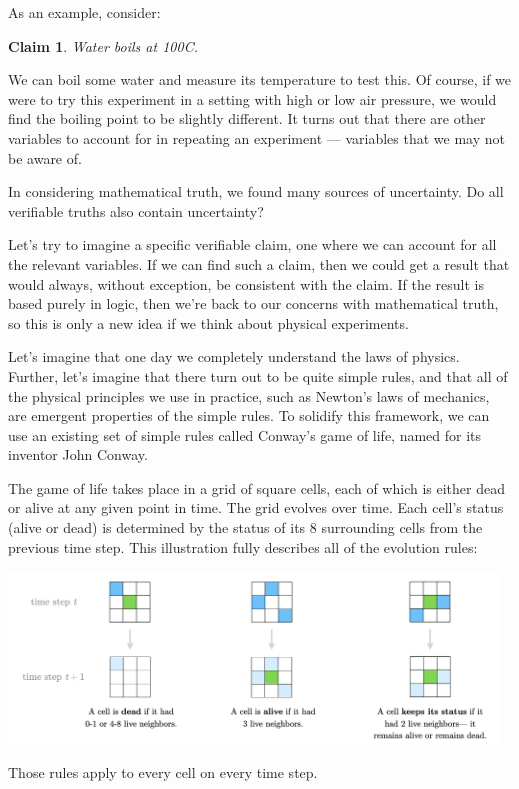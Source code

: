 \documentclass[11pt, oneside]{article}   	%
\newtheorem{claim}{Claim}
\begin{document}
As an example, consider:
\begin{claim}
    Water boils at 100\/\degree C.
\end{claim}
We can boil some water and measure its temperature to test this.
Of course,
if we were to try this experiment in a setting with high or low air pressure, we
would find the boiling point to be slightly different.
It turns out that
there are other variables to account for in repeating an experiment ---
variables that we may not be aware of.

In considering mathematical truth, we found many sources of uncertainty.
Do all verifiable truths also contain uncertainty?

Let's try to imagine a specific verifiable claim, one where we can
account for all the relevant variables. If we can find such a claim, then we
could get a result that would always, without exception, be
consistent with the claim.
If the result is based purely in logic, then we're
back to our concerns with mathematical truth, so this is only a new idea if we
think about physical experiments.

Let's imagine that one day we completely understand the laws of physics.
Further, let's imagine that there turn out to be quite simple rules, and that
all of the physical principles we use in practice, such as Newton's laws of
mechanics, are emergent properties of the simple rules.
To solidify this framework, we can use an existing set of simple rules
called Conway's game of life, named for its inventor John Conway.

The game of life takes place in a grid of square cells, each of which is either
dead or alive at any given point in time. The grid evolves over
time. Each cell's status (alive or dead) is determined by the status of its 8
surrounding cells from the previous time step. This illustration fully
describes all of the evolution rules:
\begin{center}
\includegraphics[width=13cm]{gameoflife.png}
\end{center}
Those rules apply to every cell on every time step.
\end{document}
